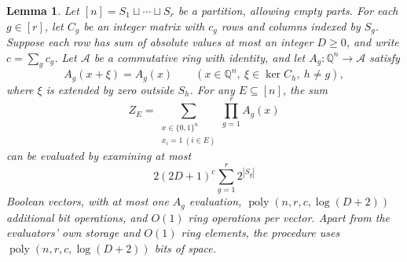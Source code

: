 \documentclass[11pt,reqno]{amsart}
\numberwithin{equation}{section}
\newtheorem{lemma}[theorem]{Lemma}
\theoremstyle{definition}\newtheorem{definition}[theorem]{Definition}
\theoremstyle{remark}\newtheorem{remark}[theorem]{Remark}
\newcommand{\poly}{\operatorname{poly}}
\renewcommand{\ge}{\geqslant}
\begin{document}
\begin{lemma}\label{lem:measurement-separation}
Let $[n]=S_1\sqcup\cdots\sqcup S_r$ be a partition, allowing empty parts.
For each $g\in[r]$, let $C_g$ be an integer matrix with $c_g$ rows
and columns indexed by $S_g$. Suppose each row has sum of absolute
values at most an integer $D\ge0$, and write $c=\sum_g c_g$.
Let $\mathcal A$ be a commutative ring with identity, and let
$A_g:\mathbb Q^n\to\mathcal A$ satisfy
\[
 A_g(x+\xi)=A_g(x)
 \qquad
 (x\in\mathbb Q^n,\ \xi\in\ker C_h,\ h\ne g),
\]
where $\xi$ is extended by zero outside $S_h$.
For any $E\subseteq[n]$, the sum
\[
 Z_E=\sum_{\substack{x\in\{0,1\}^n\\x_i=1\ (i\in E)}}
           \prod_{g=1}^r A_g(x)
\]
can be evaluated by examining at most
\[
 2(2D+1)^c\sum_{g=1}^r2^{|S_g|}
\]
Boolean vectors, with at most one $A_g$ evaluation,
$\poly(n,r,c,\log(D+2))$ additional bit operations, and $O(1)$ ring
operations per vector. Apart from the evaluators' own storage and
$O(1)$ ring elements, the procedure uses $\poly(n,r,c,\log(D+2))$
bits of space.
\end{lemma}
\end{document}
